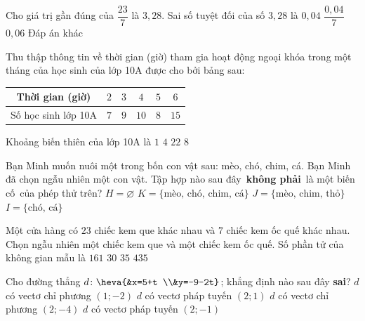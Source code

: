 \begin{ex}%
Cho giá trị gần đúng của $\dfrac{23}{7}$ là $3{,}28$. Sai số tuyệt đối của số $3{,}28$ là
\choice
{$0{,}04$}
{\True $\dfrac{0,04}{7}$}
{$0{,}06$}
{Đáp án khác}
\end{ex}

\begin{ex}%
Thu thập thông tin về thời gian (giờ) tham gia hoạt động ngoại khóa trong một tháng của học sinh của lớp 10A được cho bởi bảng sau:
\begin{center}
\begin{tabular}{|c|c|c|c|c|c|}
\hline Thời gian (giờ) & $2$ & $3$ & $4$ & $5$ & $6$ \\
\hline Số học sinh lớp 10A & $7$ & $9$ & $10$ & $8$ & $15$ \\
\hline
\end{tabular}
\end{center}
Khoảng biến thiên của lớp 10A là
\choice
{$1$}
{\True $4$}
{$22$}
{$8$}
\end{ex}

\begin{ex}%
Bạn Minh muốn nuôi một trong bốn con vật sau: mèo, chó, chim, cá. Bạn Minh đã chọn ngẫu nhiên một con vật. Tập hợp nào sau đây \textbf{không phải} là một biến cố của phép thử trên?
\choice
{$H=\varnothing $}
{$K= \{ \text{mèo, chó, chim, cá}\}$}
{\True $J= \{ \text{mèo, chim, thỏ}\}$}
{$I= \{ \text{chó, cá}\}$}
\end{ex}

\begin{ex}%
Một cửa hàng có $23$ chiếc kem que khác nhau và $7$ chiếc kem ốc quế khác nhau. Chọn ngẫu nhiên một chiếc kem que và một chiếc kem ốc quế. Số phần tử của không gian mẫu là
\choice
{\True $161$}
{$30$}
{$35$}
{$435$}
\end{ex}

\begin{ex}%
Cho đường thẳng $d \colon \heva{&x=5+t \\&y=-9-2t}$; khẳng định nào sau đây \textbf{sai}?
\choice
{$d$ có vectơ chỉ phương $(1;-2)$}
{$d$ có vectơ pháp tuyến $(2;1)$}
{$d$ có vectơ chỉ phương $(2;-4)$}
{\True $d$ có vectơ pháp tuyến $(2;-1)$}
\end{ex}

